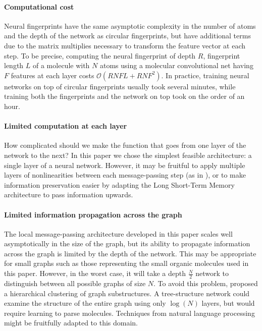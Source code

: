 \documentclass{article}
\begin{document}
\paragraph{Computational cost}
Neural fingerprints have the same asymptotic complexity in the number of atoms and the depth of the network as circular fingerprints, but have additional terms due to the matrix multiplies necessary to transform the feature vector at each step.
To be precise, computing the neural fingerprint of depth $R$, fingerprint length $L$ of a molecule with $N$ atoms using a molecular convolutional net having $F$ features at each layer costs $\mathcal{O}(RNFL + RNF^2)$.
In practice, training neural networks on top of circular fingerprints usually took several minutes, while training both the fingerprints and the network on top took on the order of an hour.

\paragraph{Limited computation at each layer}
How complicated should we make the function that goes from one layer of the network to the next?
In this paper we chose the simplest feasible architecture: a single layer of a neural network.
However, it may be fruitful to apply multiple layers of nonlinearities between each message-passing step (as in \cite{graphnn2009}), or to make information preservation easier by adapting the Long Short-Term Memory~\citep{hochreiter1997long} architecture to pass information upwards.

\paragraph{Limited information propagation across the graph}
The local message-passing architecture developed in this paper scales well asymptotically in the size of the graph, but its ability to propagate information across the graph is limited by the depth of the network.
This may be appropriate for small graphs such as those representing the small organic molecules used in this paper.
However, in the worst case, it will take a depth $\frac{N}{2}$ network to distinguish between all possible graphs of size $N$.
To avoid this problem, \citet{bruna2013spectral} proposed a hierarchical clustering of graph substructures.
A tree-structure network could examine the structure of the entire graph using only $\log(N)$ layers, but would require learning to parse molecules.
Techniques from natural language processing~\citep{tai2015improved} might be fruitfully adapted to this domain.
\end{document}
